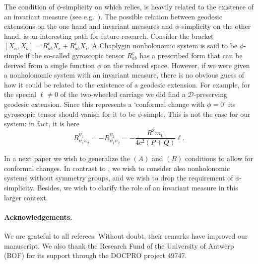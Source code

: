 \documentclass[11pt]{article}
\begin{document}
The condition of $\phi$-simplicity on which \cite{recent} relies, is heavily related to the existence of an invariant measure (see e.g.\ \cite{LuisJC}).
The possible relation between geodesic extensions on the one hand and invariant measures and $\phi$-simplicity on the other hand, is an interesting path for future research.
Consider the bracket $[X_a,X_b] = R_{ab}^c X_c + R_{ab}^i X_i$. A Chaplygin nonholonomic system is said to be $\phi$-simple if the so-called gyroscopic tensor $R_{ab}^c$ has a prescribed form that can be derived from a single function $\phi$ on the reduced space.  However, if we were given a  nonholonomic system with an invariant measure, there is no obvious guess of how it could be related to the existence of a geodesic extension.  For example, for the special  $\ell\neq 0$ of  the two-wheeled carriage we did find a $\mathcal D$-preserving geodesic extension. Since this represents  a `conformal change with $\phi=0$'  its gyroscopic tensor should vanish for it to be   $\phi$-simple. This is not the case for our system: in fact, it is here
\[
R^{\psi_1}_{\psi_1\psi_2} = -R^{\psi_2}_{\psi_1\psi_2} = -\frac{R^3 m_0 }{4c^2(P+Q)} \ell.
\]

In a next paper we wish to generalize  the $(A)$ and $(B)$ conditions to allow for conformal changes. In contrast to \cite{recent}, we wish to consider also nonholonomic systems without symmetry groups, and we wish to drop the requirement of $\phi$-simplicity. Besides, we wish to clarify the role of an invariant measure in this larger context.
 

 



\paragraph{Acknowledgements.}  We are grateful to all referees. Without doubt, their remarks have improved our manuscript. We also  thank the   Research Fund of the University of Antwerp (BOF) for its support through the DOCPRO project  49747.
\end{document}

